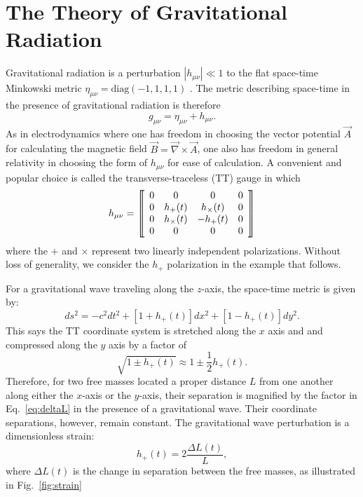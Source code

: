 \section{The Theory of Gravitational Radiation}
Gravitational radiation is a perturbation $|h_{\mu \nu}| \ll 1$ to the
flat space-time Minkowski metric $\eta_{\mu \nu} = \mbox{diag}(-1, 1,
1, 1)$ \cite{Carroll1997Lecture}. The metric describing space-time in
the presence of gravitational radiation is therefore
\begin{equation}
g_{\mu\nu} = \eta_{\mu\nu} + h_{\mu\nu}.
\end{equation}
As in electrodynamics where one has freedom in choosing the
vector potential $\vec{A}$ for calculating the magnetic field $\vec{B}
= \vec{\nabla} \times \vec{A}$, one also has freedom in general
relativity in choosing the form of $h_{\mu \nu}$ for ease of calculation. A
convenient and popular choice is called the transverse-traceless (TT)
gauge in which
\begin{equation}
h_{\mu \nu} = 
\left\llbracket \begin{array}{c c c c} 
0 & 0 & 0 & 0\\ 
0 & h_+(t) & h_\times(t) & 0 \\
0 & h_\times(t) & -h_+(t) & 0 \\
0 & 0 & 0 & 0
\end{array} \right\rrbracket
\end{equation}
where the $+$ and $\times$ represent two linearly independent
polarizations. Without loss of generality, we consider the $h_+$
polarization in the example that follows.

For a gravitational wave traveling along the $z$-axis, the space-time
metric is given by:
\begin{equation}
ds^2 = -c^2dt^2 + [1+h_+(t)] dx^2 + [1-h_+(t)] dy^2.
\end{equation}
This says the TT coordinate system is stretched along the $x$ axis and
and compressed along the $y$ axis by a factor of 
\begin{equation}
\sqrt{1 \pm h_+(t)} \approx 1 \pm \frac{1}{2} h_+(t).
\label{eq:deltaL}
\end{equation}
Therefore, for two free masses located a proper distance $L$ from one
another along either the $x$-axis or the $y$-axis, their separation is
magnified by the factor in Eq.~\ref{eq:deltaL} in the presence of a
gravitational wave. Their coordinate separations, however, remain
constant. The gravitational wave perturbation is a dimensionless
strain:
\begin{equation}
h_+(t) = 2 \frac{\Delta L(t)}{L},
\end{equation}
where $\Delta L(t)$ is the change in separation between the free
masses, as illustrated in Fig.~\ref{fig:strain}

